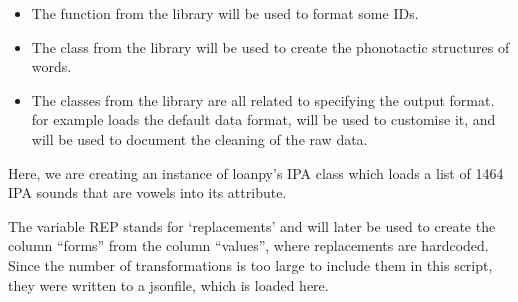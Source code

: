 \documentclass[letterpaper,10pt,english]{sphinxmanual}
\begin{document}
{{{{\begin{itemize}
\item {} 
\sphinxAtStartPar
The 
function from the  library
will be used to format some IDs.

\item {} 
\sphinxAtStartPar
The 
class from the 
library will be used to create the phonotactic structures of words.

\item {} 
\sphinxAtStartPar
The classes from the 
library are all related to specifying the output format.  for
example loads the default data format,  will be used to customise
it, and  will be used to document the cleaning of the raw data.

\end{itemize}

\begin{sphinxVerbatim}[commandchars=\\\{\}]
  
\end{sphinxVerbatim}

\sphinxAtStartPar
Here, we are creating an instance of loanpy’s IPA class which loads
a list of 1464 IPA sounds that are vowels into its  attribute.

\begin{sphinxVerbatim}[commandchars=\\\{\}]
   
      \PYG{p}{[}      \PYG{p}{]}
\end{sphinxVerbatim}

\sphinxAtStartPar
The variable REP stands for ‘replacements’ and will later be used to create
the column “forms” from the column “values”, where replacements are
hard\sphinxhyphen{}coded. Since the number of transformations is too large to include them
in this script, they were written to a json\sphinxhyphen{}file, which is loaded here.

}}}}
\end{document}
